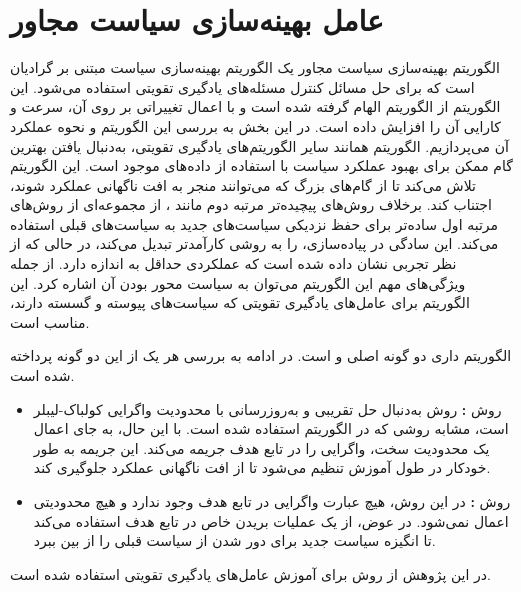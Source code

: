 \section{عامل بهینه‌سازی سیاست مجاور}\label{sec:PPO}
الگوریتم 
بهینه‌سازی سیاست مجاور
 یک الگوریتم بهینه‌سازی سیاست مبتنی بر گرادیان است که برای حل مسائل کنترل مسئله‌های یادگیری تقویتی استفاده می‌شود. این الگوریتم از الگوریتم 
 الهام گرفته شده است و با اعمال تغییراتی بر روی آن، سرعت و کارایی آن را افزایش داده است. در این بخش به بررسی این الگوریتم و نحوه عملکرد آن می‌پردازیم.
 الگوریتم  همانند سایر الگوریتم‌های یادگیری تقویتی، به‌دنبال یافتن بهترین گام ممکن برای بهبود عملکرد سیاست با استفاده از داده‌های موجود است. این الگوریتم تلاش می‌کند تا از گام‌های بزرگ که می‌توانند منجر به افت ناگهانی عملکرد شوند، اجتناب کند.
 برخلاف روش‌های پیچیده‌تر مرتبه دوم مانند 
 ، 
  از مجموعه‌ای از روش‌های مرتبه اول ساده‌تر برای حفظ نزدیکی سیاست‌های جدید به سیاست‌های قبلی استفاده می‌کند. این سادگی در پیاده‌سازی،  را به روشی کارآمدتر تبدیل می‌کند، در حالی که از نظر تجربی نشان داده شده است که عملکردی حداقل به اندازه  دارد.
  از جمله ویژگی‌های مهم این الگوریتم می‌توان به سیاست محور بودن آن اشاره کرد.
  این الگوریتم برای عامل‌های یادگیری تقویتی که سیاست‌های پیوسته و گسسته دارند، مناسب است.


  الگوریتم
  داری دو گونه اصلی 
    و
    است. در ادامه به بررسی هر یک از این دو گونه پرداخته شده است.
    \begin{itemize}
        \item
         روش\textbf{
         :}
        روش
         به‌دنبال حل تقریبی و به‌روز‌رسانی با 
        محدودیت واگرایی کولباک-لیبلر
است، مشابه روشی که در الگوریتم  استفاده شده است.
 با این حال، به جای اعمال یک محدودیت سخت،
  واگرایی  را در تابع هدف جریمه می‌کند. این جریمه به طور خودکار در طول آموزش تنظیم می‌شود تا از افت ناگهانی عملکرد جلوگیری کند.
    \item
     روش\textbf{
    :}
    در این روش، هیچ عبارت واگرایی  در تابع هدف وجود ندارد و هیچ محدودیتی اعمال نمی‌شود. در عوض،
     از یک عملیات بریدن خاص در تابع هدف استفاده می‌کند تا انگیزه سیاست جدید برای دور شدن از سیاست قبلی را از بین ببرد.    
    \end{itemize}
    در این پژوهش از روش 
    برای آموزش عامل‌های یادگیری تقویتی استفاده شده است.

